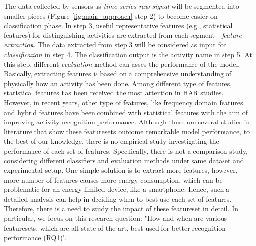 \documentclass[journal,article,submit,moreauthors,pdftex]{Definitions/mdpi}
\begin{document}
The data collected by sensors as \textit{time series raw signal} will be segmented into smaller pieces (Figure \ref{fig:main_approach} step 2) to become easier on classification phase. In step 3, useful representative features (e.g., statistical features) for distinguishing activities are extracted from each segment - \textit{feature extraction}\cite{rosati2018comparison, wang2019survey}. The data extracted from step 3 will be considered as input for \textit{classification} in step 4. The classification output is the activity name in step 5. At this step, different \textit{evaluation} method can asses the performance of the model.\\
Basically, extracting features is based on a comprehensive understanding of physically how an activity has been done. Among different type of features, statistical features has been received the most attention in HAR studies. However, in recent years, other type of features, like frequency domain features and hybrid features have been combined with statistical features with the aim of improving activity recognition performance\cite{wang2019survey, morris2014recofit}. Although there are several studies in literature that show these featuresets outcome remarkable model performance, to the best of our knowledge, there is no empirical study investigating the performance of each set of features. Specifically, there is not a comparison study, considering different classifiers and evaluation methods under same dataset and experimental setup. One simple solution is to extract more features, however, more number of features causes more energy consumption, which can be problematic for an energy-limited device, like a smartphone\cite{Nourani_CoMoRea2019}. Hence, such a detailed analysis can help in deciding when to best use each set of features. Therefore, there is a need to study the impact of these featureset in detail. In particular, we focus on this research question: "How and when are various featuresets, which are all state-of-the-art, best used for better recognition performance (RQ1)".
\end{document}
